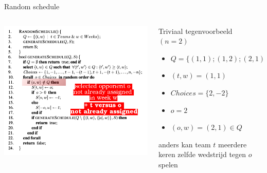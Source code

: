 \documentclass{beamer}
\begin{document}
\begin{frame}{Random schedule}
 
\begin{columns}[T]
\begin{column}{0.5\textwidth}
  \includegraphics[width=\textwidth]{randomscheduleALG_phixr3}
\end{column}

\begin{column}{0.5\textwidth}
\begin{exampleblock}{Triviaal tegenvoorbeeld $(n=2)$}
 \scriptsize{\begin{itemize}
  \item $Q = \{(1,1);(1,2);(2,1);(2,2)\}$
  \item $(t,w) = (1,1)$
  \item $Choices = \{2,-2\}$
  \item $o = 2 $
  \item $(o,w) = (2,1) \in Q$ 
 \end{itemize}}

\end{exampleblock}

\alert{anders kan team $t$ meerdere keren zelfde wedstrijd tegen $o$ spelen}
\end{column}

\end{columns}

\end{frame}
\end{document}
